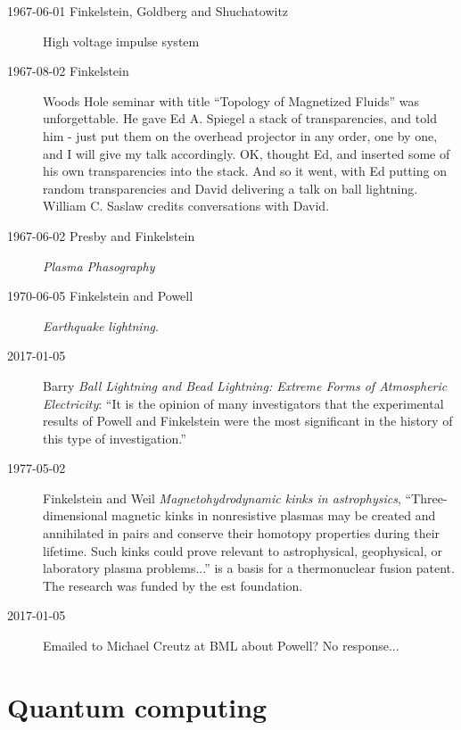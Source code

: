 \begin{description}
\item[1967-06-01 Finkelstein, Goldberg and  Shuchatowitz]
 {High voltage impulse system}

\item[1967-08-02 Finkelstein]
Woods Hole seminar with title ``Topology of Magnetized Fluids'' was
unforgettable. He gave Ed A. Spiegel a stack of transparencies, and told
him - just put them on the overhead projector in any order, one by one,
and I will give my talk accordingly. OK, thought Ed, and inserted some of
his own transparencies into the stack. And so it went, with Ed putting on
random transparencies and David delivering a talk on ball lightning.
{William C. Saslaw} credits
{conversations} with David.

\item[1967-06-02 Presby and Finkelstein]
{\em Plasma Phasography}

\item[1970-06-05 Finkelstein and Powell]
{\em Earthquake lightning}.

\item[2017-01-05]
Barry {\em Ball Lightning and Bead Lightning: Extreme Forms
of Atmospheric Electricity}: ``It is the opinion of many
investigators that the experimental results of Powell and
Finkelstein were the most significant in the
history of this type of investigation.''

\item[1977-05-02]
Finkelstein and Weil
{\em Magnetohydrodynamic kinks in astrophysics},
``Three-dimensional magnetic kinks in nonresistive plasmas may be created and
annihilated in pairs and conserve their homotopy properties during their
lifetime. Such kinks could prove relevant to astrophysical, geophysical, or
laboratory plasma problems...'' is a basis for a thermonuclear fusion
patent. The research was funded by the est foundation.

\item[2017-01-05]
Emailed to Michael Creutz at BML about Powell? No response...


\end{description}

\section{Quantum computing}
\label{sect:Qcomput}

